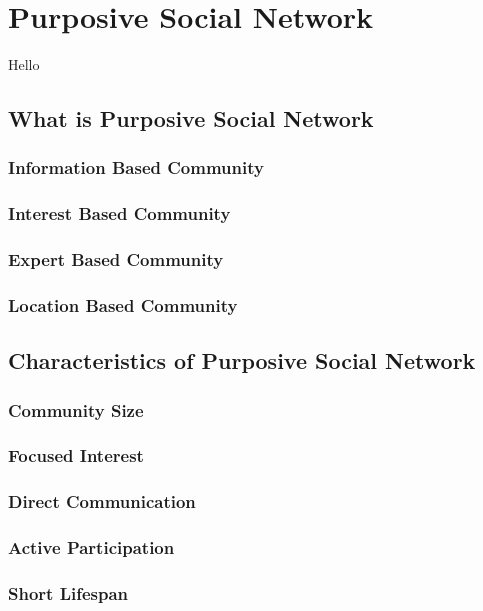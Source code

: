 

\chapter{Purposive Social Network} \label{Chapter:Purposive Social Network}
Hello

\section{What is Purposive Social Network}
\subsection{Information Based Community}
\subsection{Interest Based Community}
\subsection{Expert Based Community}
\subsection{Location Based Community}

\section{Characteristics of Purposive Social Network}
\subsection{Community Size}
\subsection{Focused Interest}
\subsection{Direct Communication}
\subsection{Active Participation}
\subsection{Short Lifespan}
